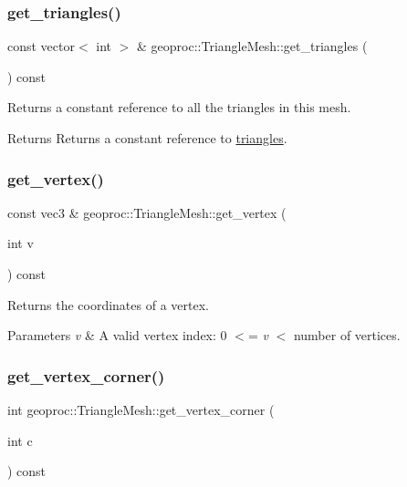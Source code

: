 \subsubsection{\texorpdfstring{get\+\_\+triangles()}{get\_triangles()}}
{\footnotesize\ttfamily const vector$<$ int $>$ \& geoproc\+::\+Triangle\+Mesh\+::get\+\_\+triangles (\begin{DoxyParamCaption}{ }\end{DoxyParamCaption}) const}



Returns a constant reference to all the triangles in this mesh. 

\begin{DoxyReturn}{Returns}
Returns a constant reference to \hyperlink{classgeoproc_1_1TriangleMesh_ad1cf20622f2bb080100862f413bd89c2}{triangles}. 
\end{DoxyReturn}
\mbox{\label{classgeoproc_1_1TriangleMesh_a9c231aaac3dfbfe9b6334df6cabb741e}} 
\subsubsection{\texorpdfstring{get\+\_\+vertex()}{get\_vertex()}}
{\footnotesize\ttfamily const vec3 \& geoproc\+::\+Triangle\+Mesh\+::get\+\_\+vertex (\begin{DoxyParamCaption}\item[{int}]{v }\end{DoxyParamCaption}) const}



Returns the coordinates of a vertex. 


\begin{DoxyParams}{Parameters}
{\em v} & A valid vertex index\+: 0 $<$= {\itshape v} $<$ number of vertices. \\
\hline
\end{DoxyParams}
\mbox{\label{classgeoproc_1_1TriangleMesh_aba03ea01f69c0888e0aae17ec330d31d}} 
\subsubsection{\texorpdfstring{get\+\_\+vertex\+\_\+corner()}{get\_vertex\_corner()}}
{\footnotesize\ttfamily int geoproc\+::\+Triangle\+Mesh\+::get\+\_\+vertex\+\_\+corner (\begin{DoxyParamCaption}\item[{int}]{c }\end{DoxyParamCaption}) const}



